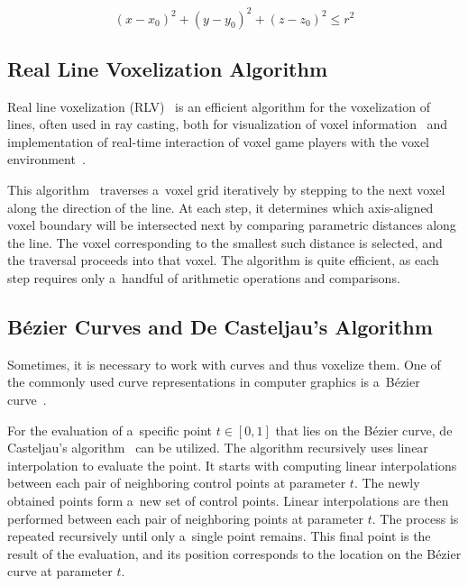 \begin{equation}\label{eq:sphere_distance_check}
    (x - x_0)^2 + (y - y_0)^2 + (z - z_0)^2 \leq r^2
\end{equation}


\subsection{Real Line Voxelization Algorithm}\label{rlv}
Real line voxelization (RLV)~\cite{real_line_voxelization, voxel_algo_data_structs} is an efficient algorithm for the voxelization of lines, often used in ray casting, both for visualization of voxel information~\cite{real_line_voxelization} and implementation of real-time interaction of voxel game players with the voxel environment~\cite{bloxel_bachelor_thesis}.

This algorithm~\cite{real_line_voxelization, voxel_algo_data_structs} traverses a~voxel grid iteratively by stepping to the next voxel along the direction of the line. At each step, it determines which axis-aligned voxel boundary will be intersected next by comparing parametric distances along the line. The voxel corresponding to the smallest such distance is selected, and the traversal proceeds into that voxel. The algorithm is quite efficient, as each step requires only a~handful of arithmetic operations and comparisons.

\subsection{Bézier Curves and De Casteljau's Algorithm}\label{bezier_de_casteljau_algo}
Sometimes, it is necessary to work with curves and thus voxelize them. One of the commonly used curve representations in computer graphics is a~Bézier curve~\cite{bezier_curves}.

For the evaluation of a~specific point $t \in \left[0, 1\right]$ that lies on the Bézier curve, de Casteljau's algorithm~\cite{bezier_curves} can be utilized. The algorithm recursively uses linear interpolation to evaluate the point. It starts with computing linear interpolations between each pair of neighboring control points at parameter $t$. The newly obtained points form a~new set of control points. Linear interpolations are then performed between each pair of neighboring points at parameter $t$. The process is repeated recursively until only a~single point remains. This final point is the result of the evaluation, and its position corresponds to the location on the Bézier curve at parameter $t$.

